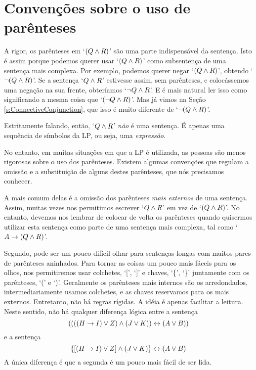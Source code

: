 \section{Convenções sobre o uso de parênteses}
\label{TFLconventions}
A rigor, os parênteses em `$(Q \wedge R)$' são uma parte indispensável da sentença.
Isto é assim porque podemos querer usar `$(Q \wedge R)$' como subsentença de uma sentença mais complexa.
Por exemplo, podemos querer negar `$(Q \wedge R)$', obtendo `$\neg(Q \wedge R)$'.
Se a sentença `$Q \wedge R$' estivesse assim, sem parênteses, e colocássemos uma negação na sua frente, obteríamos `$\neg Q \wedge R$'.
E é mais natural ler isso como significando a mesma coisa que `$(\neg Q \wedge R)$'.
Mas já vimos na Seção \ref{s:ConnectiveConjunction}, que isso é muito diferente de `$\neg(Q \wedge R)$'.

Estritamente falando, então, `$Q \wedge R$' \emph{não} é uma sentença.
É apenas uma sequência de símbolos da LP, ou seja, uma \emph{expressão}.

No entanto, em muitas situações em que a LP é utilizada, as pessoas são menos rigorosas sobre o uso dos parênteses.
Existem algumas convenções que regulam a omissão e a substituição de alguns destes parênteses, que nós precisamos conhecer.

A mais comum delas é a omissão dos parênteses \emph{mais externos} de uma sentença.
Assim, muitas vezes nos permitimos escrever `$Q \wedge R$' em vez de `$(Q \wedge R)$'.
No entanto, devemos nos lembrar de colocar de volta os parênteses quando quisermos utilizar esta sentença como parte de uma sentença mais complexa, tal como `$A \rightarrow (Q \wedge R)$'.

Segundo, pode ser um pouco difícil olhar para sentenças longas com muitos pares de parênteses aninhados.
Para tornar as coisas um pouco mais fáceis para os olhos, nos permitiremos usar colchetes, `[', `]' e chaves, `\{', `\}' juntamente com os parênteses, `(' e `)'.
Geralmente os parênteses mais internos são os arredondados, intermediariamente usamos colchetes, e as chaves reservamos para os mais externos.
Entretanto, não há regras rígidas.
A idéia é apenas facilitar a leitura.
Neste sentido, não há qualquer diferença lógica entre a sentença
$$((((H \rightarrow I) \vee Z) \wedge (J \vee K)) \leftrightarrow (A \vee B))$$
e a sentença
$$\{[(H \rightarrow I) \vee Z] \wedge (J \vee K)\} \leftrightarrow (A \vee B)$$
A única diferença é que a segunda é um pouco mais fácil de ser lida.


\practiceproblems

